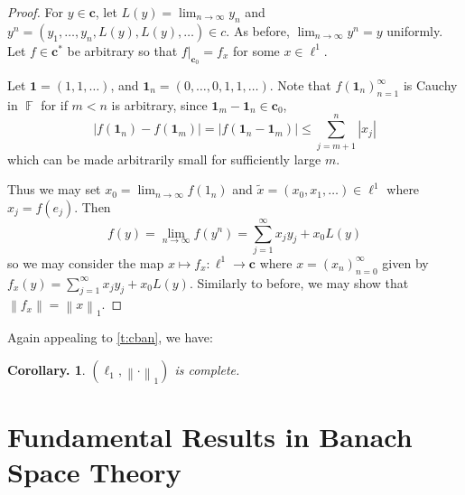 \documentclass[11pt, a4paper]{memoir}
\DeclareMathOperator{\F}{{\mathbb{F}}}
\newcommand{\norm}[1]{\ensuremath{\left\lVert#1\right\rVert}}
\theoremstyle{change}
\newtheorem{corollary}[theorem]{Corollary.}
\theoremstyle{plain}
\theoremstyle{nonumberplain}
\newtheorem{proof}{Proof}
\newcommand{\lp}[1]{\ensuremath{\ell^{#1}}}
\newcommand{\csn}{\ensuremath{\mathbf{c}}}
\newcommand{\csz}{\ensuremath{\mathbf{c}_0}}
\numberwithin{equation}{section}
\begin{document}
\begin{proof}
    For $y\in \csn$, let $L(y)=\lim_{n\to\infty}y_n$ and $y^n=(y_1,\ldots,y_n,L(y),L(y),\ldots)\in c$.
    As before, $\lim_{n\to\infty}y^n=y$ uniformly.
    Let $f\in\csn^*$ be arbitrary so that $f|_{\csz}=f_x$ for some $x\in\lp{1}$.

    Let $\mathbf{1}=(1,1,\ldots)$, and $\mathbf{1}_n=(0,\ldots,0,1,1,\ldots)$.
    Note that $f(\mathbf{1}_n)_{n=1}^\infty$ is Cauchy in $\F$ for if $m<n$ is arbitrary, since $\mathbf{1}_m-\mathbf{1}_n\in\csz$,
    \begin{equation*}
        |f(\mathbf{1}_n)-f(\mathbf{1}_m)| = |f(\mathbf{1}_n-\mathbf{1}_m)|\leq \sum_{j=m+1}^n|x_j|
    \end{equation*}
    which can be made arbitrarily small for sufficiently large $m$.

    Thus we may set $x_0=\lim_{n\to\infty}f(1_n)$ and $\tilde x=(x_0,x_1,\ldots)\in\lp{1}$ where $x_j=f(e_j)$.
    Then
    \begin{equation*}
        f(y)=\lim_{n\to\infty}f(y^n)=\sum_{j=1}^\infty x_jy_j+x_0L(y)
    \end{equation*}
    so we may consider the map $x\mapsto f_x:\lp{1}\to\csn$ where $x=(x_n)_{n=0}^\infty$ given by $f_x(y)=\sum_{j=1}^\infty x_jy_j+x_0L(y)$.
    Similarly to before, we may show that $\norm{f_x}=\norm{x}_1$.
\end{proof}
Again appealing to \cref{t:cban}, we have:
\begin{corollary}
    $(\ell_1,\norm{\cdot}_1)$ is complete.
\end{corollary}
\section{Fundamental Results in Banach Space Theory}
\end{document}

